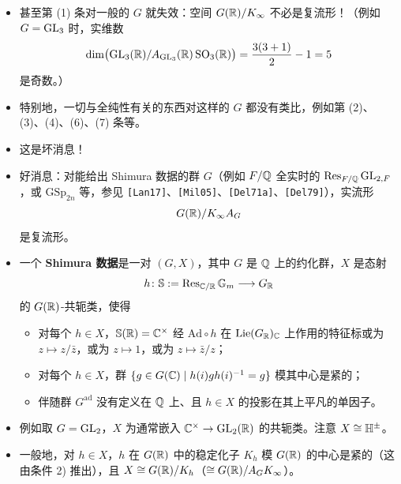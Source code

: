 \begin{itemize}
\item 甚至第 (1) 条对一般的 $G$ 就失效：空间 $G(\mathbb{R})/K_\infty$ 不必是复流形！（例如 $G=\operatorname{GL}_3$ 时，实维数
\[
\dim\bigl(\operatorname{GL}_3(\mathbb{R})/A_{\operatorname{GL}_3}(\mathbb{R})\operatorname{SO}_3(\mathbb{R})\bigr)=\frac{3(3+1)}{2}-1=5
\]
是奇数。）
\item 特别地，一切与全纯性有关的东西对这样的 $G$ 都没有类比，例如第 (2)、(3)、(4)、(6)、(7) 条等。
\item 这是坏消息！
\item 好消息：对能给出 Shimura 数据的群 $G$（例如 $F/\mathbb{Q}$ 全实时的 $\operatorname{Res}_{F/\mathbb{Q}}\operatorname{GL}_{2,F}$，或 $\mathrm{GSp}_{2n}$ 等，参见 \texttt{[Lan17]}、\texttt{[Mil05]}、\texttt{[Del71a]}、\texttt{[Del79]}），实流形
\[
G(\mathbb{R})/K_\infty A_G
\]
是复流形。
\item 一个 \textbf{Shimura 数据}是一对 $(G,X)$，其中 $G$ 是 $\mathbb{Q}$ 上的约化群，$X$ 是态射
\[
h\colon\mathbb S:=\operatorname{Res}_{\mathbb{C}/\mathbb{R}}\mathbb{G}_m\longrightarrow G_{\mathbb{R}}
\]
的 $G(\mathbb{R})$-共轭类，使得
\begin{itemize}
\item[1)] 对每个 $h\in X$，$\mathbb S(\mathbb{R})=\mathbb{C}^\times$ 经 $\mathrm{Ad}\circ h$ 在 $\operatorname{Lie}(G_{\mathbb{R}})_{\mathbb{C}}$ 上作用的特征标或为 $z\mapsto z/\bar z$，或为 $z\mapsto1$，或为 $z\mapsto\bar z/z$；
\item[2)] 对每个 $h\in X$，群 $\{g\in G(\mathbb{C})\mid h(i)gh(i)^{-1}=g\}$ 模其中心是紧的；
\item[3)] 伴随群 $G^{\mathrm{ad}}$ 没有定义在 $\mathbb{Q}$ 上、且 $h\in X$ 的投影在其上平凡的单因子。
\end{itemize}
\item 例如取 $G=\operatorname{GL}_2$，$X$ 为通常嵌入 $\mathbb{C}^\times\to\operatorname{GL}_2(\mathbb{R})$ 的共轭类。注意 $X\cong\mathbb{H}^\pm$。
\item 一般地，对 $h\in X$，$h$ 在 $G(\mathbb{R})$ 中的稳定化子 $K_h$ 模 $G(\mathbb{R})$ 的中心是紧的（这由条件 2) 推出），且 $X\cong G(\mathbb{R})/K_h$（$\cong G(\mathbb{R})/A_GK_\infty$）。
\end{itemize}

